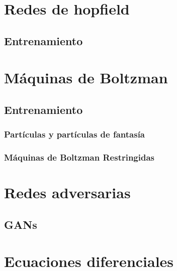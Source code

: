 \documentclass[12pt,openany]{book}
\begin{document}
\chapter{Redes de hopfield}
\section{Entrenamiento}

\chapter{Máquinas de Boltzman}
\section{Entrenamiento}
\subsection{Partículas y partículas de fantasía}
\subsection{Máquinas de Boltzman Restringidas}

\chapter{Redes adversarias}
\section{GANs}

\appendix 
\chapter{Ecuaciones diferenciales}

\backmatter

\printbibliography[heading=bibintoc]
\end{document}
